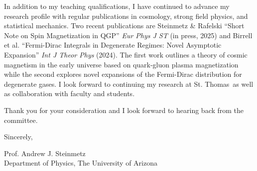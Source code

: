 \documentclass[11pt]{article}
\newcommand*{\ShortName}{St. Thomas}
\begin{document}
In addition to my teaching qualifications, I have continued to advance my research profile with regular publications in cosmology, strong field physics, and statistical mechanics. Two recent publications are Steinmetz \& Rafelski ``Short Note on Spin Magnetization in QGP'' \emph{Eur Phys J ST} (in press, 2025) and Birrell et al. ``Fermi-Dirac Integrals in Degenerate Regimes: Novel Asymptotic Expansion'' \emph{Int J Theor Phys} (2024). The first work outlines a theory of cosmic magnetism in the early universe based on quark-gluon plasma magnetization while the second explores novel expansions of the Fermi-Dirac distribution for degenerate gases. I look forward to continuing my research at \ShortName\ as well as collaboration with faculty and students.

Thank you for your consideration and I look forward to hearing back from the committee.


\vspace{1em}

\noindent
Sincerely,

\vspace{3em}

\noindent
Prof. Andrew J. Steinmetz\\
Department of Physics, The University of Arizona
\end{document}
